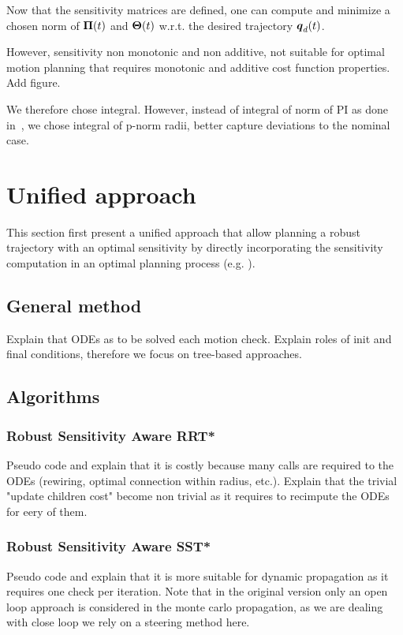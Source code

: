 Now that the sensitivity matrices are defined, one can compute and minimize a chosen norm of $\boldsymbol{\Pi}(t)$ and $\boldsymbol{\Theta}(t)$ w.r.t. the desired trajectory $\boldsymbol{q}_d(t)$.

However, sensitivity non monotonic and non additive, not suitable for optimal motion planning that requires monotonic and additive cost function properties.
Add figure.

We therefore chose integral.
However, instead of integral of norm of PI as done in~\cite{cPi,cTh}, we chose integral of p-norm radii, better capture deviations to the nominal case.

\section{Unified approach}

This section first present a unified approach that allow planning a robust trajectory with an optimal sensitivity by directly incorporating the sensitivity computation in an optimal planning process (e.g. ).

\subsection{General method}
Explain that ODEs as to be solved each motion check.
Explain roles of init and final conditions, therefore we focus on tree-based approaches.

\subsection{Algorithms}
\subsubsection{Robust Sensitivity Aware RRT*}
Pseudo code and explain that it is costly because many calls are required to the ODEs (rewiring, optimal connection within radius, etc.).
Explain that the trivial "update children cost" become non trivial as it requires to recimpute the ODEs for eery of them.
\subsubsection{Robust Sensitivity Aware SST*}
Pseudo code and explain that it is more suitable for dynamic propagation as it requires one check per iteration.
Note that in the original version only an open loop approach is considered in the monte carlo propagation, as we are dealing with close loop we rely on a steering method here.

